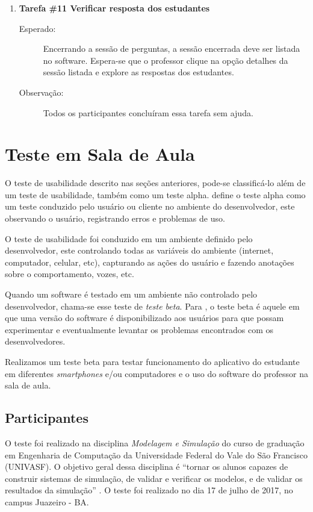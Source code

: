 \begin{enumerate}[label={},leftmargin=*]
  \item \textbf{Tarefa \#11 Verificar resposta dos estudantes}
  \begin{description}
    \item  [Esperado:] Encerrando a sessão de perguntas, a sessão encerrada deve ser listada no software.
    Espera-se que o professor clique na opção detalhes da sessão listada e explore as respostas dos estudantes.
    \item [Observação:] Todos os participantes concluíram essa tarefa sem ajuda.
  \end{description}
\end{enumerate}

\section{Teste em Sala de Aula}

O teste de usabilidade descrito nas seções anteriores, pode-se classificá-lo além de um teste de usabilidade,
também como um teste alpha.  define o teste alpha como um teste
conduzido pelo usuário ou cliente no ambiente do desenvolvedor, este observando
o usuário, registrando erros e problemas de uso.

O teste de usabilidade foi conduzido em um ambiente definido pelo desenvolvedor, este controlando
todas as variáveis do ambiente (internet, computador, celular, etc), capturando as ações do usuário e
fazendo anotações sobre o comportamento, vozes, etc.

Quando um software é testado em um ambiente não controlado pelo desenvolvedor,
chama-se esse teste de \textit{teste beta}. Para , o teste beta é aquele em
que uma versão do software é disponibilizado aos usuários para que possam experimentar e
eventualmente levantar os problemas encontrados com os desenvolvedores.

Realizamos um teste beta para testar funcionamento do aplicativo do estudante em diferentes
\textit{smartphones} e/ou computadores e o uso do software do professor na sala de aula.

\subsection{Participantes}

O teste foi realizado na disciplina \textit{Modelagem e Simulação} do curso de graduação
em Engenharia de Computação da Universidade Federal do Vale do São Francisco (UNIVASF).
O objetivo geral dessa disciplina é ``tornar os alunos capazes de construir sistemas de
simulação, de validar e verificar os modelos, e de validar os resultados da simulação'' \cite{ppcComputacao}.
O teste foi realizado no dia 17 de julho de 2017, no campus Juazeiro - BA.

